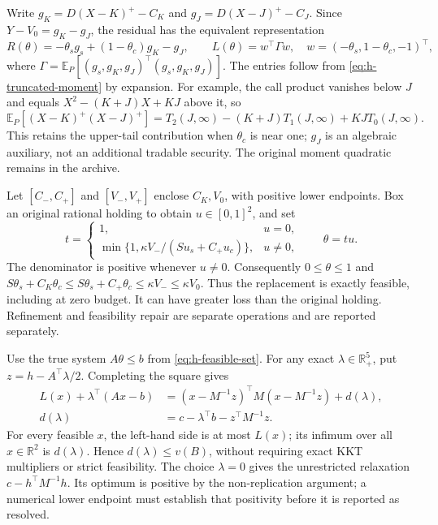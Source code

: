 \documentclass[11pt]{article}
\begin{document}
Write $g_K=D(X-K)^+-C_K$ and $g_J=D(X-J)^+-C_J$.
Since $Y-V_0=g_K-g_J$, the residual has the equivalent representation
\begin{equation}
 R(\theta)=-\theta_sg_s+(1-\theta_c)g_K-g_J,
 \qquad L(\theta)=w^\top\Gamma w,
 \quad w=(-\theta_s,1-\theta_c,-1)^\top,
 \label{eq:h-stable-gain-risk}
\end{equation}
where $\Gamma=\mathbb E_P[(g_s,g_K,g_J)^\top(g_s,g_K,g_J)]$.
The entries follow from \eqref{eq:h-truncated-moment} by expansion.
For example, the call product vanishes below $J$ and equals
$X^2-(K+J)X+KJ$ above it, so
\begin{equation}
 \mathbb E_P[(X-K)^+(X-J)^+]
 =T_2(J,\infty)-(K+J)T_1(J,\infty)+KJ T_0(J,\infty).
 \label{eq:h-upper-call-cross-moment}
\end{equation}
This retains the upper-tail contribution when $\theta_c$ is near one;
$g_J$ is an algebraic auxiliary, not an additional tradable security.
The original moment quadratic remains in the archive.

Let $[C_-,C_+]$ and $[V_-,V_+]$ enclose $C_K,V_0$, with positive
lower endpoints. Box an original rational holding to obtain
$u\in[0,1]^2$, and set
\begin{equation}
 t=\begin{cases}1,&u=0,\\
 \min\{1,\kappa V_-/(Su_s+C_+u_c)\},&u\ne0,
 \end{cases}
 \qquad \theta=tu.
 \label{eq:h-outward-feasibility}
\end{equation}
The denominator is positive whenever $u\ne0$. Consequently
$0\leq\theta\leq1$ and
$S\theta_s+C_K\theta_c\leq S\theta_s+C_+\theta_c
\leq\kappa V_-\leq\kappa V_0$.
Thus the replacement is exactly feasible, including at zero budget.
It can have greater loss than the original holding. Refinement and
feasibility repair are separate operations and are reported separately.

Use the true system $A\theta\leq b$ from
\eqref{eq:h-feasible-set}. For any exact $\lambda\in\mathbb R^5_+$, put
$z=h-A^\top\lambda/2$. Completing the square gives
\begin{equation}
 \begin{aligned}
 L(x)+\lambda^\top(Ax-b)
 &=(x-M^{-1}z)^\top M(x-M^{-1}z)+d(\lambda),\\
 d(\lambda)&=c-\lambda^\top b-z^\top M^{-1}z.
 \end{aligned}
 \label{eq:h-certified-dual}
\end{equation}
For every feasible $x$, the left-hand side is at most $L(x)$;
its infimum over all $x\in\mathbb R^2$ is $d(\lambda)$.
Hence $d(\lambda)\leq v(B)$, without requiring exact KKT multipliers
or strict feasibility. The choice $\lambda=0$ gives the unrestricted
relaxation $c-h^\top M^{-1}h$. Its optimum is positive by the
non-replication argument; a numerical lower endpoint must establish that
positivity before it is reported as resolved.
\end{document}

